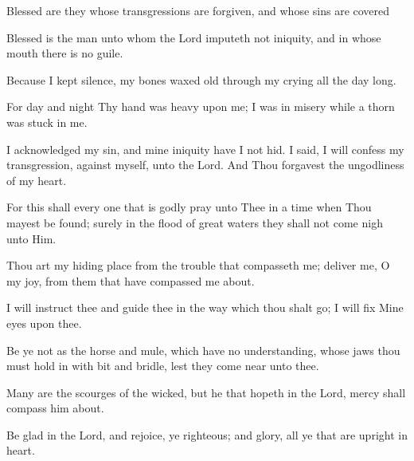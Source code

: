 Blessed are they whose transgressions are forgiven, and whose sins are covered

Blessed is the man unto whom the Lord imputeth not iniquity, and in whose mouth there is no guile.

Because I kept silence, my bones waxed old through my crying all the day long.

For day and night Thy hand was heavy upon me; I was in misery while a thorn was stuck in me.

I acknowledged my sin, and mine iniquity have I not hid. I said, I will confess my transgression, against myself, unto the Lord. And Thou forgavest the ungodliness of my heart.

For this shall every one that is godly pray unto Thee in a time when Thou mayest be found; surely in the flood of great waters they shall not come nigh unto Him.

Thou art my hiding place from the trouble that compasseth me; deliver me, O my joy, from them that have compassed me about.

I will instruct thee and guide thee in the way which thou shalt go; I will fix Mine eyes upon thee.

Be ye not as the horse and mule, which have no understanding, whose jaws thou must hold in with bit and bridle, lest they come near unto thee.

Many are the scourges of the wicked, but he that hopeth in the Lord, mercy shall compass him about.

Be glad in the Lord, and rejoice, ye righteous; and glory, all ye that are upright in heart.
